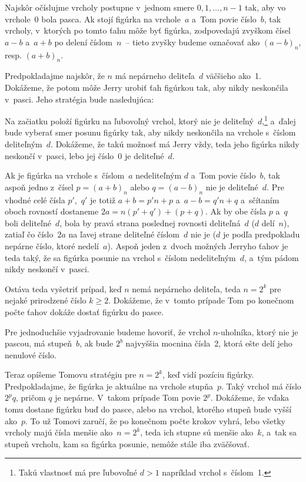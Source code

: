 {%
Najskôr očíslujme vrcholy postupne v~jednom smere
$0, 1, \ldots, n-1$ tak, aby vo vrchole~$0$ bola pasca. Ak stojí figúrka na
vrchole~$a$ a~Tom povie číslo~$b$, tak vrcholy, v~ktorých po tomto ťahu
môže byť figúrka, zodpovedajú zvyškom čísel $a-b$ a~$a+b$ po
delení číslom~$n$~-- tieto zvyšky budeme označovať ako $(a-b)_n$, resp.
$(a+b)_n$.

Predpokladajme najskôr, že $n$ má nepárneho deliteľa~$d$ väčšieho ako~1.
Dokážeme, že potom môže Jerry urobiť ťah figúrkou tak, aby nikdy
neskončila v~pasci.
Jeho stratégia bude nasledujúca:

Na začiatku položí figúrku na ľubovoľný vrchol, ktorý nie je
deliteľný~$d$,\footnote{Takú vlastnosť má pre ľubovoľné $d>1$
napríklad vrchol s~číslom~1.}
a~ďalej bude vyberať smer posunu figúrky tak,
aby nikdy neskončila na vrchole s~číslom deliteľným~$d$. Dokážeme, že
takú možnosť má Jerry vždy, teda
jeho figúrka nikdy neskončí v~pasci, lebo jej číslo~0 je deliteľné~$d$.

Ak je figúrka na vrchole s~číslom~$a$ nedeliteľným $d$ a~Tom povie číslo~$b$,
tak aspoň jedno z~čísel $p = (a+b)_n$ alebo $q = (a-b)_n$ nie je deliteľné~$d$.
Pre vhodné celé čísla $p'$,~$q'$ je totiž
$a+b = p'n+p$ a~$a-b = q'n+q$ a~sčítaním oboch rovností dostaneme
$2a = n ({p'+ q'})+(p+q)$. Ak by obe čísla $p$ a~$q$ boli deliteľné~$d$,
bola by pravá strana poslednej rovnosti deliteľná~$d$ ($d$ delí~$n$),
zatiaľ čo číslo~$2a$ na ľavej strane deliteľné číslom~$d$ nie je
($d$ je podľa predpokladu nepárne číslo, ktoré nedelí~$a$).
Aspoň jeden z~dvoch možných
Jerryho ťahov je teda taký, že sa figúrka posunie na vrchol s~číslom
nedeliteľným~$d$, a~tým pádom nikdy neskončí v~pasci.

Ostáva teda vyšetriť prípad, keď $n$ nemá nepárneho deliteľa, teda
$n = 2^k$ pre nejaké prirodzené číslo $k\ge2$.
Dokážeme, že v~tomto prípade Tom po konečnom počte
ťahov dokáže dostať figúrku do pasce.

Pre jednoduchšie vyjadrovanie budeme hovoriť, že vrchol $n$-uholníka, ktorý nie je pascou,
má stupeň~$b$, ak bude $2^b$ najvyššia mocnina čísla~2, ktorá ešte
delí jeho nenulové číslo.

Teraz opíšeme Tomovu stratégiu pre $n = 2^k$, keď vidí
pozíciu figúrky. Predpokladajme, že figúrka je aktuálne na
vrchole stupňa~$p$. Taký vrchol má číslo $2^p q$, pričom $q$ je
nepárne. V~takom prípade Tom povie $2^p$. Dokážeme, že
vďaka tomu dostane figúrku buď do pasce, alebo na vrchol, ktorého
stupeň bude vyšší ako~$p$. To už Tomovi zaručí, že po
konečnom počte krokov vyhrá, lebo všetky vrcholy majú čísla menšie
ako~$n = 2^k$, teda ich stupne sú menšie ako~$k$, a~tak sa
stupeň vrcholu, kam sa figúrka posunie, nemôže stále iba zväčšovať.

}
